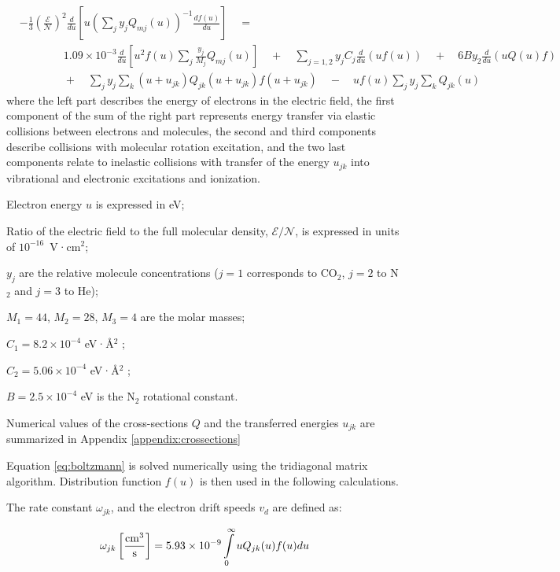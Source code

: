 \documentclass{report}
\begin{document}
\begin{align}\label{eq:boltzmann}
&- \frac{1}{3} \left(\frac{\mathcal{E}}{\mathcal{N}}\right)^2 \frac{d}{du} \left[u \left( \sum\limits_j y_j Q_{mj}(u) \right)^{-1}\frac{df(u)}{du} \right] \quad = \nonumber \\
&\qquad \qquad 1.09 \times 10^{ - 3}\frac{d}{du}\left[ u^2 f(u)\sum\limits_j \frac{y_j}{M_j} Q_{mj}(u) \right]
\quad  + \quad \sum\limits_{j = 1,2} {y_j}{C_j} \frac{d}{du}(uf(u))
\quad  + \quad 6B y_2 \frac{d}{du}\left(uQ(u)f \right)\nonumber \\
&\qquad \qquad +\quad\sum\limits_j y_j \sum\limits_k (u + u_{jk})Q_{jk} (u + u_{jk})f(u + u_{jk}) \quad  - \quad uf(u)\sum\limits_j y_j \sum\limits_k Q_{jk}(u)
\end{align}
where the left part describes the energy of electrons in the electric field, the first component of the sum of the right part represents energy transfer via elastic collisions between electrons and molecules, the second and third components describe collisions with molecular rotation excitation, and the two last components relate to inelastic collisions with transfer of the energy $u_{jk}$ into vibrational and electronic excitations and ionization.

Electron energy $u$ is expressed in eV;

Ratio of the electric field to the full molecular density, $\mathcal{E}/\mathcal{N}$, is expressed in units of $10^{-16}$~V·cm$^2$;

$y_j$ are the relative molecule concentrations ($j=1$ corresponds to CO$_2$, $j=2$ to N$_2$ and $j=3$ to He);

$M_1=44$, $M_2=28$, $M_3=4$ are the molar masses;

$C_1 = 8.2 \times 10^{-4}$ eV·Å$^2$ \cite{Hake-1967};

$C_2 = 5.06 \times 10^{-4}$ eV·Å$^2$ \cite{Frost-1962};

$B = 2.5 \times 10^{-4}$ eV is the N$_2$ rotational constant.

Numerical values of the cross-sections $Q$ and the transferred energies $u_{jk}$ are summarized in Appendix \ref{appendix:crossections} 

Equation \ref{eq:boltzmann} is solved numerically using the tridiagonal matrix algorithm. Distribution function $f(u)$ is then used in the following calculations.

The rate constant $\omega_{jk}$, and the electron drift speeds $v_d$ are defined as:

\begin{equation}\label{eq:omega_jk}
\omega _{jk}\left[\frac{\rm{cm}^3}{\text{s}} \right] = 5.93 \times 10^{-9}\int\limits_0^\infty u Q_{jk}(u)f(u)du
\end{equation}
     
\end{document}

